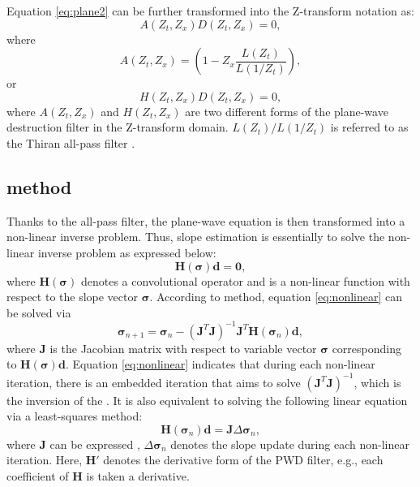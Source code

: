 Equation \ref{eq:plane2} can be further transformed into the Z-transform notation as: 
\begin{equation}
\label{eq:Z}
A(Z_t,Z_x) D(Z_t,Z_x) = 0,
\end{equation}
where 
\begin{equation}
\label{eq:Z1}
A(Z_t,Z_x) = (1-Z_x\frac{L(Z_t)}{L(1/Z_t)}),
\end{equation}
or 
\begin{equation}
\label{eq:Z2}
H(Z_t,Z_x) D(Z_t,Z_x) = 0,
\end{equation}
where 
$A(Z_t,Z_x)$ and $H(Z_t,Z_x)$ are two different forms of the plane-wave destruction filter in the Z-transform domain. $L(Z_t)/L(1/Z_t)$ is referred to as the Thiran all-pass filter \cite{thiran1971recursive,fomel2002pwd,zhonghuan2013accelerated}. 

\subsection{ method}
Thanks to the all-pass filter, the plane-wave equation is then transformed into a non-linear inverse problem. Thus, slope estimation is essentially to solve the non-linear inverse problem as expressed below:
\begin{equation}
\label{eq:nonlinear}
\mathbf{H}(\boldsymbol{\sigma})\mathbf{d}=\mathbf{0},
\end{equation}
where $\mathbf{H}(\boldsymbol{\sigma})$ denotes a convolutional operator and is a non-linear function with respect to the slope vector $\boldsymbol{\sigma}$. According to  method, equation \ref{eq:nonlinear} can be solved via
\begin{equation}
\label{eq:nonlinear2}
\boldsymbol{\sigma}_{n+1}=\boldsymbol{\sigma}_n-(\mathbf{J}^T\mathbf{J})^{-1}\mathbf{J}^T\mathbf{H}(\boldsymbol{\sigma}_n)\mathbf{d},
\end{equation}
where $\mathbf{J}$ is the Jacobian matrix with respect to variable vector $\boldsymbol{\sigma}$ corresponding to $\mathbf{H}(\boldsymbol{\sigma})\mathbf{d}$. Equation \ref{eq:nonlinear} indicates that during each non-linear iteration, there is an embedded iteration that aims to solve $(\mathbf{J}^T\mathbf{J})^{-1}$, which is the inversion of the . It is also equivalent to solving the following linear equation via a least-squares method:
\begin{equation}
\label{eq:nonlinear3}
\mathbf{H}(\boldsymbol{\sigma}_n)\mathbf{d} = \mathbf{J} \Delta \boldsymbol{\sigma}_n,
\end{equation}
where $\mathbf{J}$ can be expressed , $ \Delta \boldsymbol{\sigma}_n$ denotes the slope update during each non-linear iteration.  Here, $\mathbf{H}'$ denotes the derivative form of the PWD filter, e.g., each coefficient of $\mathbf{H}$ is taken a derivative.

